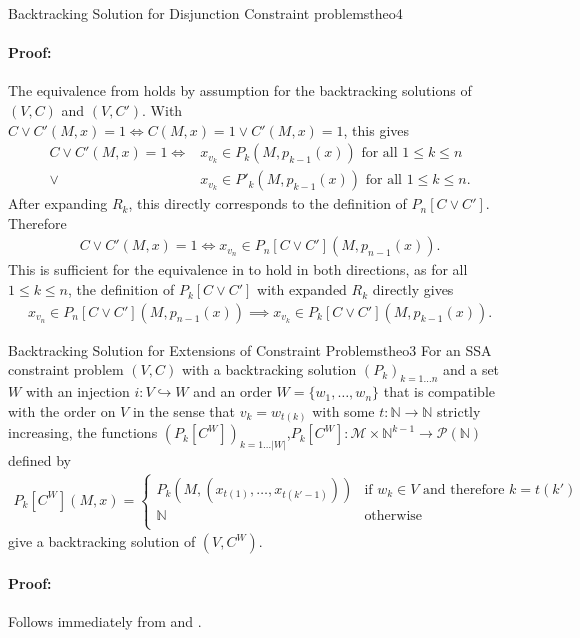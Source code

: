\begin{theorem}{Backtracking Solution for Disjunction Constraint problems}{theo4}
    \paragraph*{Proof:} The equivalence from 
                        holds by assumption for the backtracking solutions
                        of $(V,C)$ and $(V,C')$.
                        With $C\mathrel\lor C'(M,x)=1\iff C(M,x)=1\mathrel\lor C'(M,x)=1$,
                        this gives
    \begin{align*}
        C\mathrel\lor C'(M,x)=1\iff{}&x_{v_k}\in P_k(M,p_{k-1}(x))\text{ for all }1\leq k\leq n\\
                              \mathrel\lor{}&x_{v_k}\in P'_k(M,p_{k-1}(x))\text{ for all }1\leq k\leq n.
    \end{align*}
    After expanding $R_k$, this directly corresponds to the definition of
    $P_n[C\mathrel\lor C']$.
    Therefore
    \begin{align*}
        C\mathrel\lor C'(M,x)=1\iff{}x_{v_n}\in P_n[C\mathrel\lor C'](M,p_{n-1}(x)).
    \end{align*}
    This is sufficient for the equivalence in  to hold
    in both directions, as for all $1\leq k\leq n$, the definition of
    $P_k[C\mathrel\lor C']$ with expanded $R_k$ directly gives
    \begin{align*}
        x_{v_n}\in P_n[C\mathrel\lor C'](M,p_{n-1}(x))\implies x_{v_k}\in P_k[C\mathrel\lor C'](M,p_{k-1}(x)).
    \end{align*}
\end{theorem}
\begin{theorem}{Backtracking Solution for Extensions of Constraint Problems}{theo3}
    For an SSA constraint problem $(V,C)$ with a backtracking
    solution $(P_k)_{k=1\dots n}$ and a set $W$ with an injection
    $i:V\hookrightarrow W$ and an order $W=\{w_1,\dots,w_n\}$ that is
    compatible with the order on $V$ in the sense that $v_k=w_{t(k)}$ with
    some $t:\mathbb N\rightarrow\mathbb N$ strictly increasing, the functions
    $(P_k[C^W])_{k=1\dots |W|}$,$P_k[C^W]\colon\mathcal M\times\mathbb N^{k-1}\rightarrow\mathcal P(\mathbb N)$
    defined by
    \begin{align*}
        P_k[C^W](M,x)=\left\{
            \begin{array}{ll}
                P_k\left(M,\left(x_{t(1)},\dots,x_{t(k'-1)}\right)\right)&\text{if }w_k\in V\text{ and therefore }k=t(k')\\
                \mathbb N&\text{otherwise}\\
            \end{array}\right.
    \end{align*}
    give a backtracking solution of $(V,C^W)$.
    \tcblower
    \paragraph*{Proof:} Follows immediately from  and .
\end{theorem}
